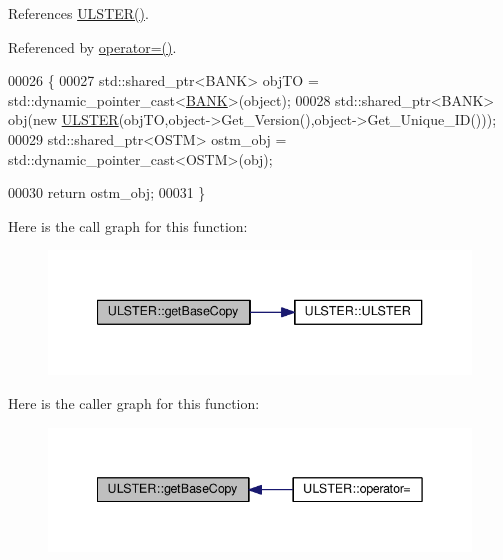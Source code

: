 References \hyperlink{_u_l_s_t_e_r_8h_source_l00024}{U\+L\+S\+T\+E\+R()}.



Referenced by \hyperlink{_u_l_s_t_e_r_8h_source_l00062}{operator=()}.


\begin{DoxyCode}
00026 \{
00027     std::shared\_ptr<BANK> objTO = std::dynamic\_pointer\_cast<\hyperlink{class_b_a_n_k}{BANK}>(object);
00028     std::shared\_ptr<BANK> obj(\textcolor{keyword}{new} \hyperlink{class_u_l_s_t_e_r_a637ad8cb5537167ab51cd079637a8323}{ULSTER}(objTO,object->Get\_Version(),\textcolor{keywordtype}{object}->Get\_Unique\_ID())); 
00029     std::shared\_ptr<OSTM> ostm\_obj = std::dynamic\_pointer\_cast<OSTM>(obj);                                 
       
00030     \textcolor{keywordflow}{return} ostm\_obj;
00031 \}
\end{DoxyCode}


Here is the call graph for this function\+:\nopagebreak
\begin{figure}[H]
\begin{center}
\leavevmode
\includegraphics[width=340pt]{class_u_l_s_t_e_r_ad0c05e562b0c67283edfa4940c9aa728_cgraph}
\end{center}
\end{figure}




Here is the caller graph for this function\+:\nopagebreak
\begin{figure}[H]
\begin{center}
\leavevmode
\includegraphics[width=342pt]{class_u_l_s_t_e_r_ad0c05e562b0c67283edfa4940c9aa728_icgraph}
\end{center}
\end{figure}


